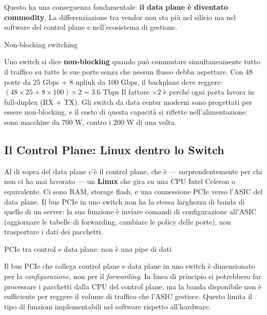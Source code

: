 \documentclass[
  italian,
  openany]{book}
\begin{document}
Questo ha una conseguenza fondamentale: \textbf{il data plane è
diventato commodity}. La differenziazione tra vendor non sta più nel
silicio ma nel software del control plane e nell'ecosistema di gestione.

\begin{calloutnote}{Non-blocking switching}

Uno switch si dice \textbf{non-blocking} quando può commutare
simultaneamente tutto il traffico su tutte le sue porte senza che nessun
flusso debba aspettare. Con 48 porte da 25 Gbps + 8 uplink da 100 Gbps,
il backplane deve reggere:
\((48 \times 25 + 8 \times 100) \times 2 = 3.6 \text{ Tbps}\) Il fattore
\(\times 2\) è perché ogni porta lavora in full-duplex (RX + TX). Gli
switch da data center moderni sono progettati per essere non-blocking, e
il costo di questa capacità si riflette nell'alimentazione: sono
macchine da 700 W, contro i 200 W di una volta.

\end{calloutnote}

\subsection{Il Control Plane: Linux dentro lo
Switch}\label{il-control-plane-linux-dentro-lo-switch}

Al di sopra del data plane c'è il control plane, che è ---
sorprendentemente per chi non ci ha mai lavorato --- un \textbf{Linux}
che gira su una CPU Intel Celeron o equivalente. Ci sono RAM, storage
flash, e una connessione PCIe verso l'ASIC del data plane. Il bus PCIe
in uno switch non ha la stessa larghezza di banda di quello di un
server: la sua funzione è inviare comandi di configurazione all'ASIC
(aggiornare le tabelle di forwarding, cambiare le policy delle porte),
non trasportare i dati dei pacchetti.

\begin{calloutwarning}{PCIe tra control e data plane: non è una pipe di dati}

Il bus PCIe che collega control plane e data plane in uno switch è
dimensionato per la \emph{configurazione}, non per il \emph{forwarding}.
In linea di principio si potrebbero far processare i pacchetti dalla CPU
del control plane, ma la banda disponibile non è sufficiente per reggere
il volume di traffico che l'ASIC gestisce. Questo limita il tipo di
funzioni implementabili nel software rispetto all'hardware.

\end{calloutwarning}
\end{document}
